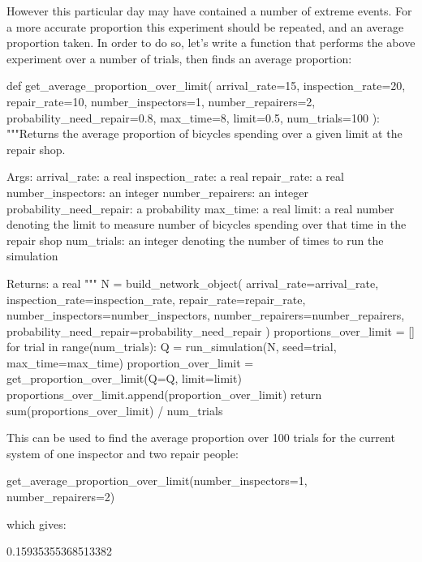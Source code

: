 However this particular day may have contained a number of extreme events.
For a more accurate proportion this experiment should be repeated, and an
average proportion taken.
In order to do so, let's write a function that performs the above experiment
over a number of trials, then finds an average proportion:

\begin{pyin}
def get_average_proportion_over_limit(
    arrival_rate=15,
    inspection_rate=20,
    repair_rate=10,
    number_inspectors=1,
    number_repairers=2,
    probability_need_repair=0.8,
    max_time=8,
    limit=0.5,
    num_trials=100
    ):
    """Returns the average proportion of bicycles spending over
    a given limit at the repair shop.
    
    Args:
        arrival_rate: a real
        inspection_rate: a real
        repair_rate: a real
        number_inspectors: an integer
        number_repairers: an integer
        probability_need_repair: a probability
        max_time: a real
        limit: a real number denoting the limit to measure number
                    of bicycles spending over that time in the
                    repair shop
        num_trials: an integer denoting the number of times to
                    run the simulation
    
    Returns:
        a real
    """
    N = build_network_object(
        arrival_rate=arrival_rate,
        inspection_rate=inspection_rate,
        repair_rate=repair_rate,
        number_inspectors=number_inspectors,
        number_repairers=number_repairers,
        probability_need_repair=probability_need_repair
    )
    proportions_over_limit = []
    for trial in range(num_trials):
        Q = run_simulation(N, seed=trial, max_time=max_time)
        proportion_over_limit = get_proportion_over_limit(Q=Q, limit=limit)
        proportions_over_limit.append(proportion_over_limit)
    return sum(proportions_over_limit) / num_trials
\end{pyin}

This can be used to find the average proportion over 100 trials for the current
system of one inspector and two repair people:

\begin{pyin}
get_average_proportion_over_limit(number_inspectors=1, number_repairers=2)
\end{pyin}

which gives:

\begin{pyout}
0.15935355368513382
\end{pyout}

